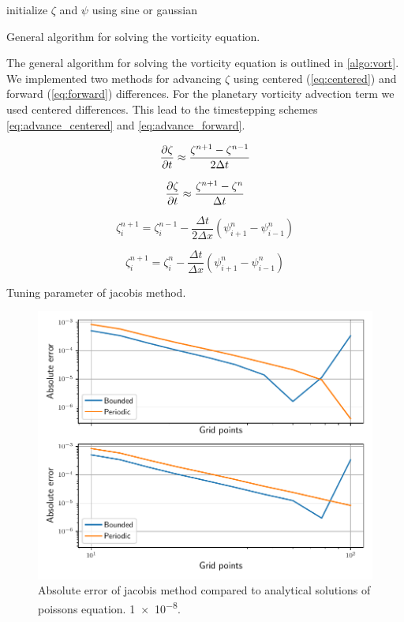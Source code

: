 \begin{algorithm}
  \SetAlgoLined
  initialize $\zeta$ and $\psi$ using sine or gaussian\\
  \caption{General algorithm for solving the vorticity equation.}
  \label{algo:vort}
\end{algorithm}


The general algorithm for solving the vorticity equation is outlined in
\cref{algo:vort}. We implemented two methods for advancing $\zeta$ using centered
(\cref{eq:centered}) and forward (\cref{eq:forward}) differences.
For the planetary vorticity advection term we used centered differences.
This lead to the timestepping schemes \cref{eq:advance_centered} and
\cref{eq:advance_forward}.


\begin{equation} \label{eq:centered}
  \pdv{\zeta}{t} \approx \frac{\zeta_{}^{n+1} - \zeta_{}^{n-1}}{2 \Delta t}
\end{equation}

\begin{equation} \label{eg:forward}
  \pdv{\zeta}{t} \approx \frac{\zeta_{}^{n+1} - \zeta_{}^{n}}{\Delta t}
\end{equation}


\begin{equation} \label{eq:advance_centered}
  \zeta_{i}^{n+1} = \zeta_{i}^{n-1} - \frac{\Delta t}{2 \Delta x}
    (\psi_{i+1}^{n} - \psi_{i-1}^{n})
\end{equation}


\begin{equation}   \label{eq:advance_forward}
  \zeta_{i}^{n+1} = \zeta_{i}^{n} - \frac{\Delta t}{\Delta x} (\psi_{i+1}^{n} - \psi_{i-1}^{n})
\end{equation}


Tuning parameter of jacobis method.

\begin{figure}[htp]
  \centering
  \includegraphics[width=\textwidth]{../figures/error_jacobi.pdf}
  \caption{Absolute error of jacobis method
  compared to analytical solutions of poissons equation. \num{1e-8}.}
  \label{fig:periodic_sine}
\end{figure}
